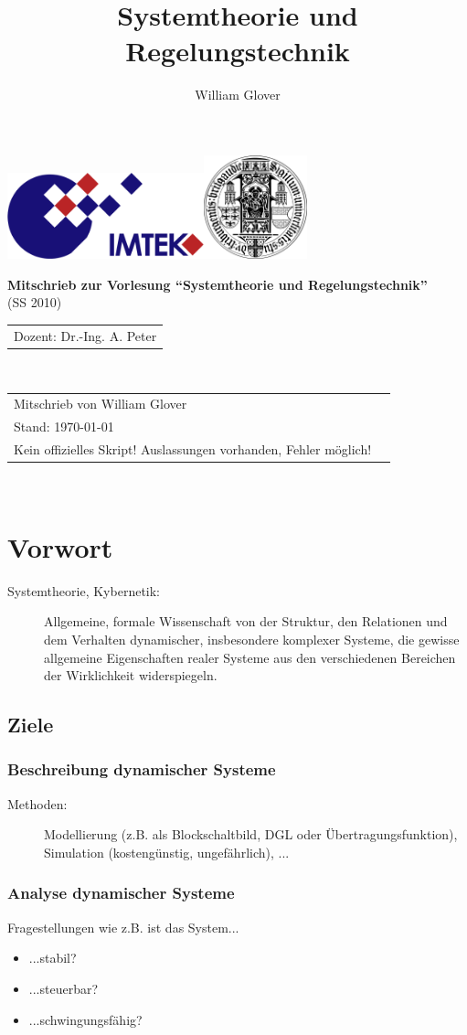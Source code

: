 \documentclass[12pt,a4paper,ngerman]{scrartcl}
\author{William Glover}
\title{Systemtheorie und Regelungstechnik}
\renewcommand\maketitle{
    \begin{titlepage}
        \sffamily
        \thispagestyle{empty}
              \includegraphics[height=2.5cm]{IMTEK_Logo_Farbe}\hfill\includegraphics[height=3cm]{Uni_Siegel}
        \par
        \vspace{2cm}
        \begin{center}
            \Huge \textbf{Mitschrieb zur Vorlesung ``Systemtheorie und Regelungstechnik''}\\
            (SS 2010)\\[6cm]
            \end{center}
           

            \begin{tabular}{l}
                \large Dozent: Dr.-Ing. A. Peter\\
         \end{tabular}
         \\
						\begin{tabular}{ll}
                \large Mitschrieb von William Glover \\
                \large Stand: \today\\
                \large Kein offizielles Skript! Auslassungen vorhanden, Fehler möglich!
            \end{tabular}
        
        

 			 \newpage 
       \thispagestyle{empty}~
       \newpage

 
\end{titlepage}
}
\renewcommand{\baselinestretch}{1.5} %
\begin{document}
\maketitle %
\clearpage %
\renewcommand{\baselinestretch}{1.5} %
\thispagestyle{empty} %

\tableofcontents %
\newpage 

\setcounter{page}{2} %


\addtocounter{section}{-1}%
\section{Vorwort}

\begin{description}
\item[Systemtheorie, Kybernetik:] Allgemeine, formale Wissenschaft von der Struktur, den Relationen und dem Verhalten dynamischer, insbesondere komplexer Systeme, die gewisse allgemeine Eigenschaften realer Systeme aus den verschiedenen Bereichen der Wirklichkeit widerspiegeln. 
\end{description}

\subsection*{Ziele}

\subsubsection*{Beschreibung dynamischer Systeme}
\begin{description}
\item[Methoden:] Modellierung (z.B. als Blockschaltbild, DGL oder Übertragungsfunktion), Simulation (kostengünstig, ungefährlich), ...
\end{description}

\subsubsection*{Analyse dynamischer Systeme}
Fragestellungen wie z.B. ist das System...
\begin{itemize}
\item ...stabil?
\item ...steuerbar?
\item ...schwingungsfähig?
\end{itemize}
\end{document}
